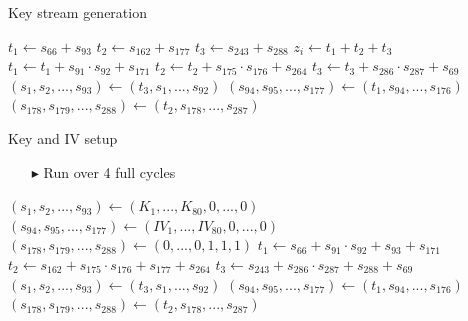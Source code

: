 \documentclass[10pt, compress]{beamer}
\begin{document}
\begin{frame}{Key stream generation}
\begin{center}
\begin{minipage}{\textwidth}
\begin{algorithm}[H]
\begin{algorithmic}[1]
 
\State $t_1 \gets s_{66} + s_{93}$
\State $t_2 \gets s_{162} + s_{177}$
\State $t_3 \gets s_{243} + s_{288}$
\State
\State $z_i \gets t_1 + t_2 + t_3$
\State
\State $t_1 \gets t_1 + s_{91} \cdot s_{92} + s_{171}$
\State $t_2 \gets t_2 + s_{175} \cdot s_{176} + s_{264}$
\State $t_3 \gets t_3 + s_{286} \cdot s_{287} + s_{69}$
\State
\State $(s_1,s_2,...,s_{93}) \gets (t_3,s_1,...,s_{92})$ 
\State $(s_{94},s_{95},...,s_{177}) \gets (t_1,s_{94},...,s_{176})$ 
\State $(s_{178},s_{179},...,s_{288}) \gets (t_2,s_{178},...,s_{287})$ 
\EndFor
\end{algorithmic}
\end{algorithm}
\end{minipage}
\end{center}
\end{frame}

\begin{frame}{Key and IV setup}
\begin{itemize}
\item[$\blacktriangleright$] Run over 4 full cycles 
\end{itemize}
\begin{center}
\begin{minipage}{\textwidth}
\begin{algorithm}[H]
\begin{algorithmic}[1]
\State $(s_1,s_2,...,s_{93}) \gets (K_1,...,K_{80},0,...,0)$ 
\State $(s_{94},s_{95},...,s_{177}) \gets (IV_1,...,IV_{80},0,...,0)$ 
\State $(s_{178},s_{179},...,s_{288}) \gets (0,...,0,1,1,1)$ 
\State
{}
\State $t_1 \gets s_{66} + s_{91} \cdot s_{92} + s_{93} + s_{171}$
\State $t_2 \gets s_{162} + s_{175} \cdot s_{176} + s_{177} + s_{264}$
\State $t_3 \gets s_{243} + s_{286} \cdot s_{287} + s_{288}+ s_{69}$
\State
\State $(s_1,s_2,...,s_{93}) \gets (t_3,s_1,...,s_{92})$ 
\State $(s_{94},s_{95},...,s_{177}) \gets (t_1,s_{94},...,s_{176})$ 
\State $(s_{178},s_{179},...,s_{288}) \gets (t_2,s_{178},...,s_{287})$ 
\EndFor
\end{algorithmic}
\end{algorithm}
\end{minipage}
\end{center}
\end{frame}
\end{document}
